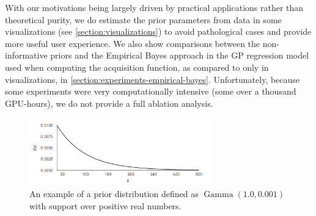 With our motivations being largely driven by practical applications rather than theoretical purity, we do estimate the prior parameters from data in some visualizations (see \autoref{section:visualizations}) to avoid pathological cases and provide more useful user experience. We also show comparisons between the non-informative priors and the Empirical Bayes approach in the GP regression model used when computing the acquisition function, as compared to only in visualizations, in \autoref{section:experiments-empirical-bayes}. Unfortunately, because some experiments were very computationally intensive (some over a thousand GPU-hours), we do not provide a full ablation analysis.

\begin{figure}
	\begin{center}
		\includegraphics[width=0.7\textwidth]{images/gamma-prior.png}
		\caption{An example of a prior distribution defined as $\operatorname{Gamma}(1.0, 0.001)$ with support over positive real numbers.}
		\label{figure:gamma-prior}
	\end{center}
\end{figure}

